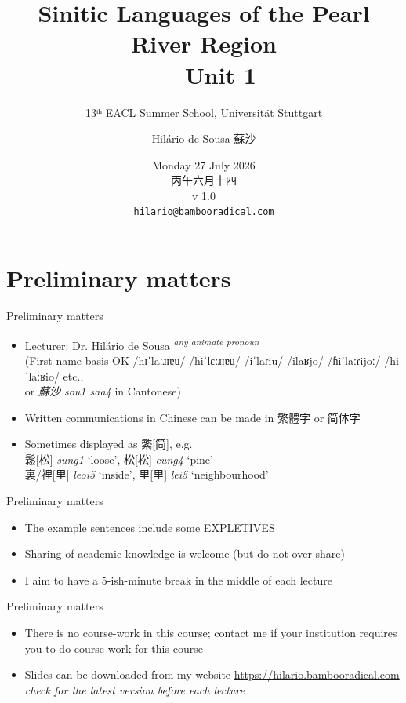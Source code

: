 \documentclass{beamer}
\title[Pearl River Sinitic]{Sinitic Languages of the Pearl River Region \\ --- Unit 1}
\subtitle{13ᵗʰ EACL Summer School, Universität Stuttgart}
\author{Hilário de Sousa 蘇沙}
\institute{EHESS–CRLAO \\ {\tiny(membre associé)}}
\date{Monday 27 July 2026 \\ 丙午六月十四 \\ v 1.0 \\ {\footnotesize \texttt{hilario@bambooradical.com}}}
\begin{document}
\begin{frame}
  \titlepage
\end{frame}


\section{Preliminary matters}

\begin{frame}{Preliminary matters}

\begin{itemize}
  \item Lecturer: Dr. Hilário de Sousa \textsuperscript{\emph{any animate pronoun}} \\ (First-name basis OK {\tiny /hɪˈlaːɹɪɐʉ/ /hiˈlɛːɹɪɐʉ/ /iˈlaɾiu/ /ilaʁjo/ /ɦiˈlaːɾijoː/ /hiˈlaːʁio/ etc.,} \\ or \emph{蘇沙 sou1 saa4} in Cantonese)
  \item Written communications in Chinese can be made in 繁體字 or 简体字
  \item Sometimes displayed as 繁[简], e.g. \\ 鬆[松] \emph{sung1} \enquote*{loose}, 松[松] \emph{cung4} \enquote*{pine} \\ 裏/裡[里] \emph{leoi5} \enquote*{inside}, 里[里] \emph{lei5} \enquote*{neighbourhood}
\end{itemize}

\end{frame}

\begin{frame}{Preliminary matters}

\begin{itemize}
  \item The example sentences include some EXPLETIVES
  \item Sharing of academic knowledge is welcome (but do not over-share)
  \item I aim to have a 5-ish-minute break in the middle of each lecture
  
\end{itemize}

\end{frame}

\begin{frame}{Preliminary matters}

\begin{itemize}
  
  \item There is no course-work in this course; contact me if your institution requires you to do course-work for this course
  \item Slides can be downloaded from my website \url{https://hilario.bambooradical.com} \\ \quad \emph{check for the latest version before each lecture}
\end{itemize}

\end{frame}
\end{document}
